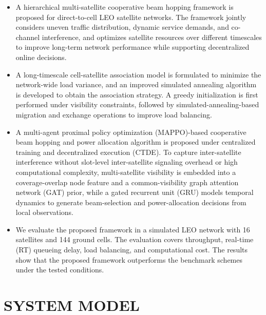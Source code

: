 \documentclass[journal]{IEEEtran}
\newcommand{\revbegin}[1]{\color{revisionblue}\ignorespaces}
\newcommand{\revend}[1]{\color{black}\ignorespaces}
\begin{document}
{\setlength{\parskip}{0pt}%
\revbegin{}\begin{itemize}[\setlength{\topsep}{2pt}]
\item A hierarchical multi-satellite cooperative beam hopping framework is proposed for direct-to-cell LEO satellite networks. The framework jointly considers uneven traffic distribution, dynamic service demands, and co-channel interference, and optimizes satellite resources over different timescales to improve long-term network performance while supporting decentralized online decisions.
\item A long-timescale cell-satellite association model is formulated to minimize the network-wide load variance, and an improved simulated annealing algorithm is developed to obtain the association strategy. A greedy initialization is first performed under visibility constraints, followed by simulated-annealing-based migration and exchange operations to improve load balancing.
\item A multi-agent proximal policy optimization (MAPPO)-based cooperative beam hopping and power allocation algorithm is proposed under centralized training and decentralized execution (CTDE). To capture inter-satellite interference without slot-level inter-satellite signaling overhead or high computational complexity, multi-satellite visibility is embedded into a coverage-overlap node feature and a common-visibility graph attention network (GAT) prior, while a gated recurrent unit (GRU) models temporal dynamics to generate beam-selection and power-allocation decisions from local observations.
\item We evaluate the proposed framework in a simulated LEO network with 16 satellites and 144 ground cells. The evaluation covers throughput, real-time (RT) queueing delay, load balancing, and computational cost. The results show that the proposed framework outperforms the benchmark schemes under the tested conditions.
\end{itemize}\revend{}
}

\section{SYSTEM MODEL}
\label{sec:system-model}
\end{document}
